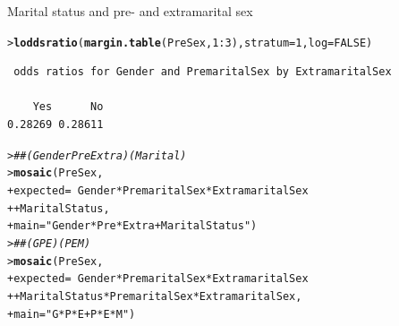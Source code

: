 \documentclass[10pt,krantz2]{krantz}\usepackage[]{graphicx}\usepackage[]{color}
\makeatletter
\newcommand{\hlnum}[1]{\textcolor[rgb]{0.686,0.059,0.569}{#1}}%
\newcommand{\hlstr}[1]{\textcolor[rgb]{0.192,0.494,0.8}{#1}}%
\newcommand{\hlcom}[1]{\textcolor[rgb]{0.678,0.584,0.686}{\textit{#1}}}%
\newcommand{\hlopt}[1]{\textcolor[rgb]{0,0,0}{#1}}%
\newcommand{\hlstd}[1]{\textcolor[rgb]{0.345,0.345,0.345}{#1}}%
\newcommand{\hlkwc}[1]{\textcolor[rgb]{0.333,0.667,0.333}{#1}}%
\newcommand{\hlkwd}[1]{\textcolor[rgb]{0.737,0.353,0.396}{\textbf{#1}}}%
\newenvironment{kframe}{%
 \def\at@end@of@kframe{}%
 \ifinner\ifhmode%
  \def\at@end@of@kframe{\end{minipage}}%
  \begin{minipage}{\columnwidth}%
 \fi\fi%
 \def\FrameCommand##1{\hskip\@totalleftmargin \hskip-\fboxsep
 \colorbox{shadecolor}{##1}\hskip-\fboxsep
     \hskip-\linewidth \hskip-\@totalleftmargin \hskip\columnwidth}%
 \MakeFramed {\advance\hsize-\width
   \@totalleftmargin\z@ \linewidth\hsize
   \@setminipage}}%
 {\par\unskip\endMakeFramed%
 \at@end@of@kframe}
\newenvironment{knitrout}{}{} %
\renewenvironment{knitrout}{\small\renewcommand{\baselinestretch}{.85}}{} %
\makeatother
\begin{document}
\begin{Example}[marital1]{Marital status and pre- and extramarital sex}
\begin{knitrout}
\color{fgcolor}\begin{kframe}
\begin{alltt}
\hlstd{> }\hlkwd{loddsratio}\hlstd{(}\hlkwd{margin.table}\hlstd{(PreSex,} \hlnum{1} \hlopt{:} \hlnum{3}\hlstd{),} \hlkwc{stratum} \hlstd{=} \hlnum{1}\hlstd{,} \hlkwc{log} \hlstd{=} \hlnum{FALSE}\hlstd{)}
\end{alltt}
\begin{verbatim}
 odds ratios for Gender and PremaritalSex by ExtramaritalSex 

    Yes      No 
0.28269 0.28611 
\end{verbatim}
\end{kframe}
\end{knitrout}



\begin{knitrout}
\color{fgcolor}\begin{kframe}
\begin{alltt}
\hlstd{> }\hlcom{## (Gender Pre Extra)(Marital)}
\hlstd{> }\hlkwd{mosaic}\hlstd{(PreSex,}
\hlstd{+ }       \hlkwc{expected} \hlstd{=} \hlopt{~} \hlstd{Gender} \hlopt{*} \hlstd{PremaritalSex} \hlopt{*} \hlstd{ExtramaritalSex}
\hlstd{+ }                  \hlopt{+} \hlstd{MaritalStatus,}
\hlstd{+ }       \hlkwc{main} \hlstd{=} \hlstr{"Gender*Pre*Extra + MaritalStatus"}\hlstd{)}
\hlstd{> }\hlcom{## (GPE)(PEM)}
\hlstd{> }\hlkwd{mosaic}\hlstd{(PreSex,}
\hlstd{+ }       \hlkwc{expected} \hlstd{=} \hlopt{~} \hlstd{Gender} \hlopt{*} \hlstd{PremaritalSex} \hlopt{*} \hlstd{ExtramaritalSex}
\hlstd{+ }                  \hlopt{+} \hlstd{MaritalStatus} \hlopt{*} \hlstd{PremaritalSex} \hlopt{*} \hlstd{ExtramaritalSex,}
\hlstd{+ }       \hlkwc{main} \hlstd{=} \hlstr{"G*P*E + P*E*M"}\hlstd{)}
\end{alltt}
\end{kframe}\begin{figure}[!htbp]


\end{figure}
\end{knitrout}
\end{Example}
\end{document}
